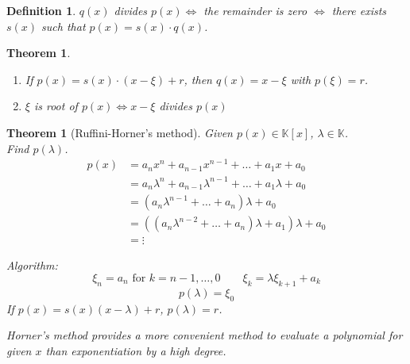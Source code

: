 \documentclass[a4paper]{article}
\newcounter{lecref}[section]
\numberwithin{lecref}{section}
\newtheorem{theorem}[lecref]{Theorem}
\newtheorem{definition}[lecref]{Definition}
\begin{document}
\begin{definition} %
  $q(x)$ \emph{divides} $p(x) \iff $ the remainder is zero
  $\iff$ there exists $s(x)$ such that $p(x) = s(x) \cdot q(x)$.
\end{definition}

\begin{theorem} %
  \begin{enumerate}
    \item If $p(x) = s(x) \cdot (x - \xi) + r$, then $q(x) = x - \xi$ with $p(\xi) = r$.
    \item $\xi$ is root of $p(x) \iff x - \xi$ divides $p(x)$
  \end{enumerate}
\end{theorem}

\begin{theorem}[Ruffini-Horner's method]
  Given $p(x) \in \mathbb K[x]$, $\lambda \in \mathbb K$. \\
  Find $p(\lambda)$.
  \begin{align*}
    p(x) &= a_n x^n + a_{n-1} x^{n-1} + \dots + a_1 x + a_0 \\
      &= a_n \lambda^n + a_{n-1} \lambda^{n-1} + \ldots + a_1 \lambda + a_0 \\
      &= \left(a_n \lambda^{n-1} + \dots + a_n\right) \lambda + a_0 \\
      &= \left((a_n \lambda^{n-2} + \dots + a_n) \lambda + a_1\right) \lambda + a_0 \\
      &= \vdots
  \end{align*}

  Algorithm:
  \[ \xi_n = a_n \text{ for } k = n-1, \dots, 0 \qquad \xi_k = \lambda \xi_{k+1} + a_k \]
  \[ p(\lambda) = \xi_0 \]
  If $p(x) = s(x) (x - \lambda) + r$, $p(\lambda) = r$.

  Horner's method provides a more convenient method to evaluate a polynomial for given $x$
  than exponentiation by a high degree.
\end{theorem}
\end{document}
